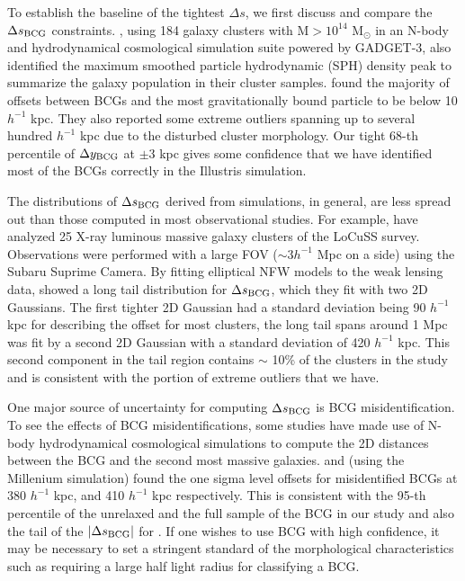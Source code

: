 To establish the baseline of the tightest $\Delta s$, we first discuss and 
compare the $\Delta s_{\rm BCG}$ constraints.   
\cite{Cui2015}, using 184 galaxy clusters with M$ > 10^{14}$ M$_\odot$ in an
N-body and hydrodynamical cosmological simulation suite powered by GADGET-3, 
also identified the maximum smoothed particle hydrodynamic (SPH) density peak
to summarize 
the galaxy population in their cluster samples. \cite{Cui2015} found
the majority of offsets between BCGs and the most gravitationally bound particle to be
below 10 $h^{-1}$ kpc. They also reported some extreme outliers 
spanning up to several hundred $h^{-1}$ kpc due to the disturbed cluster morphology. Our 
tight 68-th percentile of 
$\Delta y_{\rm BCG}$ at $ \pm 3$ kpc gives some confidence that 
we have identified most of the BCGs correctly in the Illustris simulation.

The distributions of $\Delta s_{\rm BCG}$ derived from simulations, in general, 
are less spread out than those computed in most observational studies.
For example, \cite{Oguri2010} have analyzed 25 X-ray luminous 
massive galaxy clusters of the LoCuSS survey. 
Observations were performed with a large FOV ($\sim 3 h^{-1}$ Mpc on a side) 
using the Subaru Suprime Camera. 
By fitting elliptical NFW models to the weak lensing data, \cite{Oguri2010}
showed a long tail
 distribution for $\Delta s_{\rm BCG}$, which they fit with two 2D Gaussians.
The first tighter 2D Gaussian had a standard deviation being 90
$h^{-1}$ kpc for describing the
offset for most clusters, the long tail spans around 1 Mpc was fit by a second 2D
Gaussian with a standard deviation of 420 $h^{-1}$ kpc. This second component
in the tail region contains $\sim$ 10\% of the clusters in the study and is
consistent with the portion of extreme outliers that we have.   

One major source of uncertainty for computing $\Delta s_{\rm BCG}$ is
BCG misidentification.
To see the effects of BCG misidentifications, 
some studies have made use of N-body hydrodynamical cosmological
simulations to compute the 2D distances between the BCG and 
the second most massive galaxies. \cite{Johnston2007b} and 
\cite{Hilbert2010} (using the Millenium simulation)  found 
the one sigma level offsets for misidentified BCGs at 380 $h^{-1}$ kpc, and 410 
$h^{-1}$ kpc respectively. This is consistent with the 95-th percentile of the
unrelaxed and the full sample of the BCG in our study and also the tail of the
$|\Delta s_{\rm BCG}|$ for \cite{Cui2015}. If one wishes to use BCG with high
confidence, it may be necessary to set a stringent standard of the morphological
characteristics such as requiring a large half light radius for classifying a BCG.

